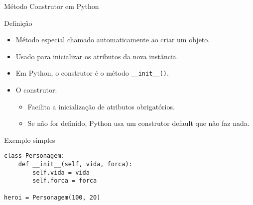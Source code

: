 \begin{frame}[fragile]{Método Construtor em Python}

\begin{block}{Definição}
\begin{itemize}
    \item Método especial chamado automaticamente ao criar um objeto.
    \item Usado para inicializar os atributos da nova instância.
    \item Em Python, o construtor é o método \texttt{\_\_init\_\_()}.
\item O construtor:
    \begin{itemize}
    \item Facilita a inicialização de atributos obrigatórios.
    \item Se não for definido, Python usa um construtor default que não faz nada.
\end{itemize}
\end{itemize}
\end{block}

\begin{exampleblock}{Exemplo simples}
\begin{verbatim}
class Personagem:
    def __init__(self, vida, forca):
        self.vida = vida
        self.forca = forca

heroi = Personagem(100, 20)
\end{verbatim}
\end{exampleblock}

\end{frame}

